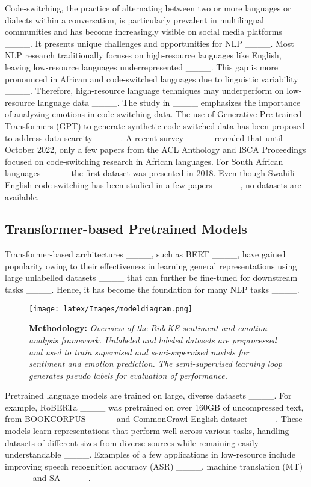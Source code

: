Code-switching, the practice of alternating between two or more languages or dialects within a conversation, is particularly prevalent in multilingual communities and has become increasingly visible on social media platforms ____. It presents unique challenges and opportunities for NLP ____. Most NLP research traditionally focuses on high-resource languages like English, leaving low-resource languages underrepresented ____. This gap is more pronounced in African and code-switched languages due to linguistic variability  ____. Therefore, high-resource language techniques may underperform on low-resource language data ____. The study in ____ emphasizes the importance of analyzing emotions in code-switching data.  
The use of Generative Pre-trained Transformers (GPT) to generate synthetic code-switched data has been proposed to address data scarcity ____. A recent survey ____ revealed that until October 2022, only a few papers from the ACL Anthology and ISCA Proceedings focused on code-switching research in African languages. 
For South African languages ____ 
the first dataset was presented in 2018.
Even though Swahili-English code-switching has been studied in a few papers ____, no datasets are available.

\subsection{ Transformer-based Pretrained Models}
Transformer-based architectures ____, such as BERT  ____, have gained popularity owing to their effectiveness in learning general representations using large unlabelled datasets ____ that can further be fine-tuned for downstream tasks ____. Hence, it has become the foundation for many NLP tasks ____.

\begin{figure}[ht!]
    \centering
    \texttt{[image: latex/Images/modeldiagram.png]}
    \caption{ \textbf{Methodology:} \textit{Overview of the RideKE sentiment and emotion analysis framework. Unlabeled and labeled datasets are preprocessed and used to train supervised and semi-supervised models for sentiment and emotion prediction. The semi-supervised learning loop generates pseudo labels for evaluation of performance.}}
    \label{fig:rideke}
\end{figure}

Pretrained language models are trained on large, diverse datasets ____. For example, RoBERTa ____ was pretrained on over 160GB of uncompressed text, from BOOKCORPUS ____ and CommonCrawl English dataset ____. These models learn representations that perform well across various tasks, handling datasets of different sizes from diverse sources while remaining easily understandable ____. Examples of a few applications in low-resource include improving speech recognition accuracy (ASR) ____, machine translation (MT)  ____ and SA ____.